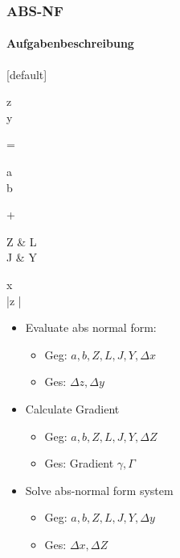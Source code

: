 \begin{frame}
	\frametitle{ABS-NF}
	\framesubtitle{Aufgabenbeschreibung}
	[default]
	\begin{flalign*}
	\begin{pmatrix}
	\Delta z \\
	\Delta y
	\end{pmatrix}
	= 
	\begin{pmatrix}
	a \\
	b
	\end{pmatrix}
	+
	\begin{pmatrix}
	Z & L \\
	J & Y 
	\end{pmatrix}
	\times
	\begin{pmatrix}
	\Delta x \\
	|\Delta z |
	\end{pmatrix}
	\end{flalign*}
	\begin{itemize}
		\item Evaluate abs normal form:
			\begin{itemize}
				\item Geg: $a,b,Z,L,J,Y,\Delta x$
				\item Ges: $\Delta z, \Delta y$
			\end{itemize}
		\item Calculate Gradient
			\begin{itemize}
				\item Geg: $a,b,Z,L,J,Y, \Delta Z$
				\item Ges: Gradient $\gamma, \Gamma$
			\end{itemize}
		\item Solve abs-normal form system
		\begin{itemize}
			\item Geg: $a,b,Z,L,J,Y,\Delta y$
			\item Ges: $\Delta x, \Delta Z$
		\end{itemize}
	\end{itemize}
\end{frame}
